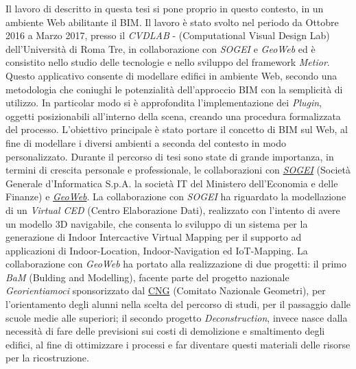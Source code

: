 Il lavoro di descritto in  questa tesi si pone proprio in questo contesto, in un ambiente Web abilitante il BIM.
Il lavoro è stato svolto nel periodo da Ottobre 2016 a Marzo 2017, presso il \emph{CVDLAB} - (Computational Visual Design Lab)
dell'Università di Roma Tre, in collaborazione con \emph{SOGEI} e \emph{GeoWeb}
ed è consistito nello studio delle tecnologie e nello sviluppo del framework \emph{Metior}.
Questo applicativo consente di modellare edifici in ambiente Web, secondo una metodologia che coniughi le potenzialità
dell’approccio BIM con la semplicità di utilizzo.
In particolar modo si è approfondita l'implementazione dei \emph{Plugin}, oggetti posizionabili all'interno della scena, creando
una procedura formalizzata del processo.
L'obiettivo principale è stato portare il concetto di BIM sul Web, al fine di modellare i diversi ambienti a seconda del
contesto in modo personalizzato.
Durante il percorso di tesi sono state di grande importanza, in termini di crescita personale e professionale,
le collaborazioni con \href{http://www.sogei.it/flex/cm/pages/ServeBLOB.php/L/IT/IDPagina/116}{\emph{SOGEI}}
(Società Generale d'Informatica S.p.A. la società IT del Ministero dell'Economia e delle Finanze)
e \href{http://www.geoweb.it/}{\emph{GeoWeb}}.
La collaborazione con \emph{SOGEI} ha riguardato la modellazione di un \emph{Virtual CED} (Centro Elaborazione Dati),
realizzato con l'intento di avere un modello 3D navigabile, che consenta lo sviluppo di un sistema per
la generazione di Indoor Intercactive Virtual Mapping per il supporto ad applicazioni di Indoor-Location, Indoor-Navigation
ed IoT-Mapping.
La collaborazione con \emph{GeoWeb} ha portato alla realizzazione di due progetti: il primo \emph{BaM} (Bulding and Modelling),
facente parte del progetto nazionale \emph{Georientiamoci}
sponsorizzato dal \href{http://www.cng.it/it/consiglio-nazionale}{CNG} (Comitato Nazionale Geometri),
per l'orientamento degli alunni nella scelta del percorso di studi,
per il passaggio dalle scuole medie alle superiori;
il secondo progetto \emph{Deconstruction}, invece nasce dalla necessità di fare delle previsioni
sui costi di demolizione e smaltimento degli edifici, al fine di ottimizzare i processi e far
diventare questi materiali delle risorse per la ricostruzione.
\newpage
